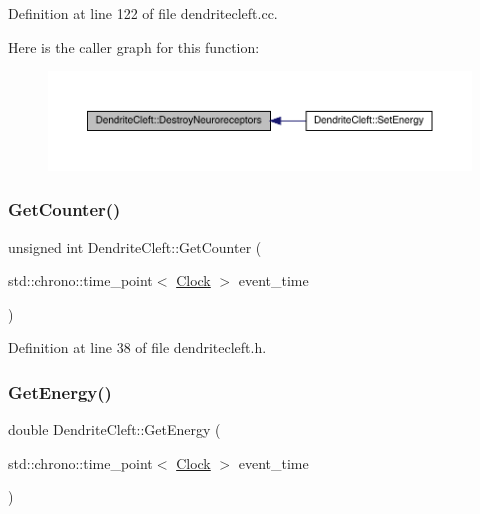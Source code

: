 Definition at line 122 of file dendritecleft.\+cc.

Here is the caller graph for this function\+:\nopagebreak
\begin{figure}[H]
\begin{center}
\leavevmode
\includegraphics[width=350pt]{class_dendrite_cleft_a630e00e2d1108f2a43bcac9466e4681b_icgraph}
\end{center}
\end{figure}
\mbox{\label{class_dendrite_cleft_ac567530d9f083e1ee65d5c6484cc9fa7}} 
\subsubsection{\texorpdfstring{Get\+Counter()}{GetCounter()}}
{\footnotesize\ttfamily unsigned int Dendrite\+Cleft\+::\+Get\+Counter (\begin{DoxyParamCaption}\item[{std\+::chrono\+::time\+\_\+point$<$ \hyperlink{universe_8h_a0ef8d951d1ca5ab3cfaf7ab4c7a6fd80}{Clock} $>$}]{event\+\_\+time }\end{DoxyParamCaption})\hspace{0.3cm}{\ttfamily [inline]}}



Definition at line 38 of file dendritecleft.\+h.

\mbox{\label{class_dendrite_cleft_ad673df32db3982b3df745a55bf527834}} 
\subsubsection{\texorpdfstring{Get\+Energy()}{GetEnergy()}}
{\footnotesize\ttfamily double Dendrite\+Cleft\+::\+Get\+Energy (\begin{DoxyParamCaption}\item[{std\+::chrono\+::time\+\_\+point$<$ \hyperlink{universe_8h_a0ef8d951d1ca5ab3cfaf7ab4c7a6fd80}{Clock} $>$}]{event\+\_\+time }\end{DoxyParamCaption})\hspace{0.3cm}{\ttfamily [inline]}}



